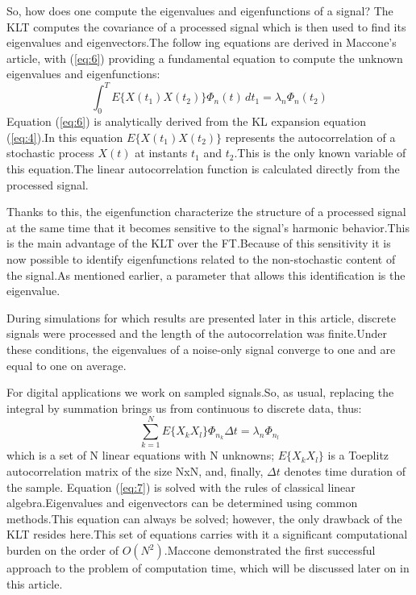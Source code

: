 \documentclass[12pt]{report}
\begin{document}
So, how does one compute the eigenvalues and eigenfunctions of a signal? The KLT computes the covariance of a processed signal which is then used to find its eigenvalues and eigenvectors.\@ The follow
ing equations are derived in Maccone's article, with (\ref{eq:6}) providing a fundamental equation to compute the unknown eigenvalues and eigenfunctions:
\begin{equation}
	\int_{0}^{T}E\{X(t_1)X(t_2)\}\Phi_n(t)\,dt_1=\lambda_n\Phi_n(t_2)
	\label{eq:6}
\end{equation}
Equation (\ref{eq:6}) is analytically derived from the KL expansion equation (\ref{eq:4}).\@ In this equation $E\{X(t_1)X(t_2)\}$ represents the autocorrelation of a stochastic process $X(t)$ at instants $t_1$ and $t_2$.\@ This is the only known variable of this equation.\@ The linear autocorrelation function is calculated directly from the processed signal.

Thanks to this, the eigenfunction characterize the structure of a processed signal at the same time that it becomes sensitive to the signal's harmonic behavior.\@ This is the main advantage of the KLT over the FT.\@ Because of this sensitivity it is now possible to identify eigenfunctions related to the non-stochastic content of the signal.\@ As mentioned earlier, a parameter that allows this identification is the eigenvalue.

During simulations for which results are presented later in this article, discrete signals were processed and the length of the autocorrelation was finite.\@ Under these conditions, the eigenvalues of a noise-only signal converge to one and are equal to one on average.

For digital applications we work on sampled signals.\@ So, as usual, replacing the integral by summation brings us from continuous to discrete data, thus:
\begin{equation}
	\label{eq:7}
	\sum_{k=1}^{N}E\{X_kX_l\}{\Phi}_{n_k}{\Delta}t=\lambda_n \Phi_{n_l}
\end{equation}
which is a set of N linear equations with N unknowns; $E\{{X_k}{X_l}\}$ is a Toeplitz autocorrelation matrix of the size NxN, and, finally, ${\Delta}t$ denotes time duration of the sample.
Equation (\ref{eq:7}) is solved with the rules of classical linear algebra.\@ Eigenvalues and eigenvectors can be determined using common methods.\@ This equation can always be solved; however, the only drawback of the KLT resides here.\@ This set of equations carries with it a significant computational burden on the order of $O(N^2)$.\@ Maccone demonstrated the first successful approach to the problem of computation time, which will be discussed later on in this article.
\end{document}
